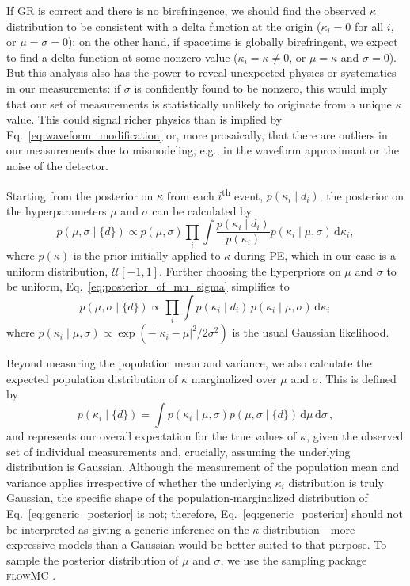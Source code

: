 \documentclass[aps,prd,twocolumn,superscriptaddress,preprintnumbers,floatfix,nofootinbib]{revtex4-2}
\newcommand{\infd}{\mathrm{d}}
\begin{document}
If \ac{GR} is correct and there is no birefringence, we should find the observed $\kappa$ distribution to be consistent with a delta function at the origin ($\kappa_i = 0$ for all $i$, or $\mu=\sigma=0$); on the other hand, if spacetime is globally birefringent, we expect to find a delta function at some nonzero value ($\kappa_i = \kappa \neq 0$, or $\mu = \kappa$ and $\sigma=0$).
But this analysis also has the power to reveal unexpected physics or systematics in our measurements: if $\sigma$ is confidently found to be nonzero, this would imply that our set of measurements is statistically unlikely to originate from a unique $\kappa$ value.
This could signal richer physics than is implied by Eq.~\eqref{eq:waveform_modification} or, more prosaically, that there are outliers in our measurements due to mismodeling, e.g., in the waveform approximant or the noise of the detector.

Starting from the posterior on $\kappa$ from each $i$\textsuperscript{th} event, $p(\kappa_i\mid d_i)$, the posterior on the hyperparameters $\mu$ and $\sigma$ can be calculated by
\begin{equation}
    p(\mu,\sigma \mid \{d\})\propto p(\mu,\sigma)\prod_{i}\int\frac{p(\kappa_i\mid d_i)}{p(\kappa_i)}p(\kappa_i\mid\mu,\sigma)\,\infd\kappa_i,
    \label{eq:posterior_of_mu_sigma}
\end{equation}
where $p(\kappa)$ is the prior initially applied to $\kappa$ during \ac{PE}, which in our case is a uniform distribution, $\mathcal{U}[-1,1]$.
Further choosing the hyperpriors on $\mu$ and $\sigma$ to be uniform, Eq.~\eqref{eq:posterior_of_mu_sigma} simplifies to
\begin{equation}
    p(\mu,\sigma\mid\{d\})\propto\prod_{i}\int p(\kappa_i\mid d_i)\, p(\kappa_i\mid\mu,\sigma)\,\infd\kappa_i\,
\end{equation}
where $p(\kappa_i\mid\mu,\sigma) \propto \exp(-|\kappa_i - \mu|^2/2\sigma^2)$ is the usual Gaussian likelihood.

Beyond measuring the population mean and variance, we also calculate the expected population distribution of $\kappa$ marginalized over $\mu$ and $\sigma$.
This is defined by
\begin{equation}
p(\kappa_i \mid \{d\})=\int p(\kappa_i \mid \mu,\sigma)p(\mu,\sigma\mid \{d\})\,\infd\mu\,\infd\sigma\, , 
    \label{eq:generic_posterior}
\end{equation}
and represents our overall expectation for the true values of $\kappa$, given the observed set of individual measurements and, crucially, assuming the underlying distribution is Gaussian.
Although the measurement of the population mean and variance applies irrespective of whether the underlying $\kappa_i$ distribution is truly Gaussian, the specific shape of the population-marginalized distribution of Eq.~\eqref{eq:generic_posterior} is not; therefore, Eq.~\eqref{eq:generic_posterior} should not be interpreted as giving a generic inference on the $\kappa$ distribution---more expressive models than a Gaussian would be better suited to that purpose. 
To sample the posterior distribution of $\mu$ and $\sigma$, we use the sampling package \textsc{flowMC} \citep{flowMC}.
\end{document}
